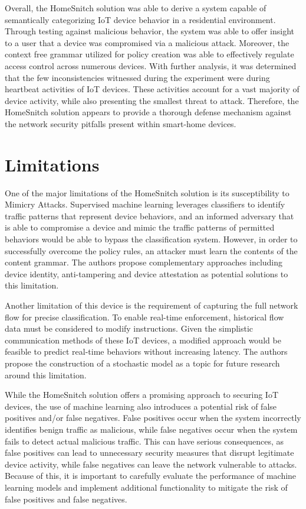 Overall, the HomeSnitch solution was able to derive a system capable of semantically categorizing IoT device behavior in a residential environment. Through testing against malicious behavior, the system was able to offer insight to a user that a device was compromised via a malicious attack. Moreover, the context free grammar utilized for policy creation was able to effectively regulate access control across numerous devices. With further analysis, it was determined that the few inconsistencies witnessed during the experiment were during heartbeat activities of IoT devices. These activities account for a vast majority of device activity, while also presenting the smallest threat to attack. Therefore, the HomeSnitch solution appears to provide a thorough defense mechanism against the network security pitfalls present within smart-home devices. 

\section{Limitations}

One of the major limitations of the HomeSnitch solution is its susceptibility to Mimicry Attacks. Supervised machine learning leverages classifiers to identify traffic patterns that represent device behaviors, and an informed adversary that is able to compromise a device and mimic the traffic patterns of permitted behaviors would be able to bypass the classification system. However, in order to successfully overcome the policy rules, an attacker must learn the contents of the content grammar. The authors propose complementary approaches including device identity, anti-tampering and device attestation as potential solutions to this limitation. 

Another limitation of this device is the requirement of capturing the full network flow for precise classification. To enable real-time enforcement, historical flow data must be considered to modify instructions. Given the simplistic communication methods of these IoT devices, a modified approach would be feasible to predict real-time behaviors without increasing latency. The authors propose the construction of a stochastic model as a topic for future research around this limitation.

While the HomeSnitch solution offers a promising approach to securing IoT devices, the use of machine learning also introduces a potential risk of false positives and/or false negatives. False positives occur when the system incorrectly identifies benign traffic as malicious, while false negatives occur when the system fails to detect actual malicious traffic. This can have serious consequences, as false positives can lead to unnecessary security measures that disrupt legitimate device activity, while false negatives can leave the network vulnerable to attacks. Because of this, it is important to carefully evaluate the performance of machine learning models and implement additional functionality to mitigate the risk of false positives and false negatives.

